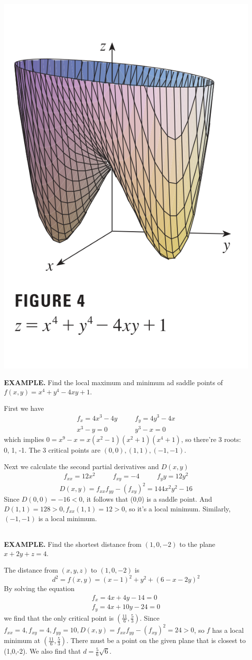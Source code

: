 \documentclass{article}
\begin{document}
\begin{minipage}[]{0.3\linewidth}
  \includegraphics[width = 4.3 cm]{./images/min4.png}
  
\end{minipage}
\begin{minipage}[]{0.67\linewidth}
{\selectfont \textbf{\textcolor{blue5}{ EXAMPLE.}}} Find the local maximum and minimum ad saddle points of $f(x,y) = x^4 + y^4 - 4xy + 1$.

First we have 
\begin{align*}
  f_x = 4x^3 - 4y & \quad & f_y = 4y^3 - 4x \\
  x^3 - y = 0 & \quad & y^3 - x = 0 
\end{align*}
which implies $0 = x^9 - x = x(x^2 - 1)(x^2 + 1)(x^4  + 1 )$, so there're 3 roots: 0, 1, -1. The 3 critical points are $(0,0), (1,1), (-1, -1)$.

Next we calculate the second partial derivatives and $D(x,y)$
\begin{align*}
  f_{xx} = 12x^2 & \quad & f_{xy} = -4 & \quad & f_yy = 12y^2 
\end{align*}
\[D(x,y) = f_{xx}f_{yy} - (f_{xy})^2 = 144 x^2 y^2 - 16 \]
Since $D(0,0) = -16 < 0$, it follows that (0,0) is a saddle point. And $D(1,1) = 128 >0, f_{xx}(1,1) = 12 > 0$, so it's a local minimum. Similarly, $(-1,-1)$ is a local minimum.
  
\end{minipage}\\
{\selectfont \textbf{\textcolor{blue5}{ EXAMPLE.}}} Find the shortest distance from $(1,0,-2)$ to the plane $x + 2y + z = 4 $.

The distance from $(x,y,z )$ to $(1,0,-2 )$ is 
\[d^2 = f(x,y) = (x - 1)^2 + y^2 + (6-x-2y)^2   \]
By solving the equation 
\begin{align*}
  f_x = 4x + 4y -  14 = 0 \\
  f_y = 4x + 10y - 24 = 0 
\end{align*}
we find that the only critical point is $\left( \frac{11 }{6 }, \frac{5 }{3 } \right)$. Since $f_{xx} = 4, f_{xy} = 4, f_{yy} = 10 , D(x,y) = f_{xx}f_{yy} - (f_{xy})^2 = 24 > 0 $, so $f$ has a local minimum at $\left( \frac{11 }{6 }, \frac{5 }{3 } \right)$. There must be a point on the given plane that is closest to (1,0,-2). We also find that $d = \frac{5 }{6 } \sqrt{6 }$.
\end{document}
